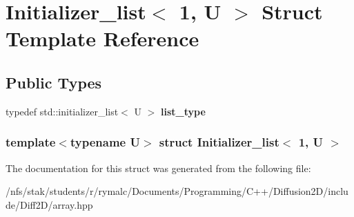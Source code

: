 \hypertarget{structInitializer__list_3_011_00_01U_01_4}{
\section{Initializer\_\-list$<$ 1, U $>$ Struct Template Reference}
\label{structInitializer__list_3_011_00_01U_01_4}
}
\subsection*{Public Types}
\begin{DoxyCompactItemize}
\item 
\hypertarget{structInitializer__list_3_011_00_01U_01_4_a84155c0e2c82ce1298dfa8ae00c670c6}{
typedef std::initializer\_\-list$<$ U $>$ {\bfseries list\_\-type}}
\label{structInitializer__list_3_011_00_01U_01_4_a84155c0e2c82ce1298dfa8ae00c670c6}

\end{DoxyCompactItemize}
\subsubsection*{template$<$typename U$>$ struct Initializer\_\-list$<$ 1, U $>$}



The documentation for this struct was generated from the following file:\begin{DoxyCompactItemize}
\item 
/nfs/stak/students/r/rymalc/Documents/Programming/C++/Diffusion2D/include/Diff2D/array.hpp\end{DoxyCompactItemize}
